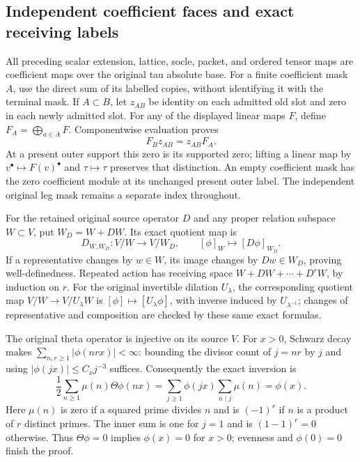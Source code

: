 \documentclass[11pt,a4paper]{article}
\theoremstyle{definition}
\begin{document}
\subsection{Independent coefficient faces and exact receiving labels}
All preceding scalar extension, lattice, socle, packet, and ordered
tensor maps are coefficient maps over the original tau absolute
base.  For a finite coefficient mask $A$, use the direct sum of its
labelled copies, without identifying it with the terminal mask.  If
$A\subset B$, let $z_{AB}$ be identity on each admitted old slot and
zero in each newly admitted slot.  For any of the displayed linear
maps $F$, define $F_A=\bigoplus_{a\in A}F$.  Componentwise evaluation
proves
\begin{equation}
 F_Bz_{AB}=z_{AB}F_A.                                \tag{IAL46}
\end{equation}
At a present outer support this zero is its supported zero; lifting
a linear map by $v^\bullet\mapsto F(v)^\bullet$ and $\tau\mapsto\tau$
preserves that distinction.  An empty coefficient mask has the zero
coefficient module at its unchanged present outer label.  The
independent original leg mask remains a separate index throughout.

For the retained original source operator $D$ and any proper relation
subspace $W\subset V$, put $W_D=W+DW$.  Its exact quotient map is
\begin{equation}
 D_{W,W_D}:V/W\longrightarrow V/W_D,\qquad
 [\phi]_W\longmapsto[D\phi]_{W_D}.                   \tag{IAL47}
\end{equation}
If a representative changes by $w\in W$, its image changes by
$Dw\in W_D$, proving well-definedness.  Repeated action has receiving
space $W+DW+\cdots+D^rW$, by induction on $r$.  For the original
invertible dilation $U_\lambda$, the corresponding quotient map
$V/W\to V/U_\lambda W$ is $[\phi]\mapsto[U_\lambda\phi]$, with
inverse induced by $U_{\lambda^{-1}}$; changes of representative and
composition are checked by these same exact formulas.

The original theta operator is injective on its source $V$.  For
$x>0$, Schwarz decay makes
$\sum_{n,r\geq1}|\phi(nrx)|<\infty$: bounding the divisor count of
$j=nr$ by $j$ and using $|\phi(jx)|\leq C_xj^{-3}$ suffices.
Consequently the exact inversion is
\begin{equation}
 \frac12\sum_{n\geq1}\mu(n)\Theta\phi(nx)
 =\sum_{j\geq1}\phi(jx)\sum_{n\mid j}\mu(n)=\phi(x).
                                                        \tag{IAL47a}
\end{equation}
Here $\mu(n)$ is zero if a squared prime divides $n$ and is $(-1)^r$
if $n$ is a product of $r$ distinct primes.  The inner sum is one
for $j=1$ and is $(1-1)^r=0$ otherwise.  Thus $\Theta\phi=0$ implies
$\phi(x)=0$ for $x>0$; evenness and $\phi(0)=0$ finish the proof.
\end{document}
